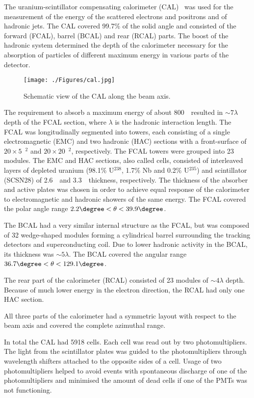 The uranium-scintillator compensating calorimeter (CAL)~\cite{thesis:kruger:1992,nim:a309:77,nim:a309:101,nim:a321:356,nim:a336:23} was used for the measurement of the energy of the scattered electrons and positrons and of hadronic jets. The CAL covered 99.7\% of the solid angle and consisted of the forward (FCAL), barrel (BCAL) and rear (RCAL) parts. The boost of the hadronic system determined the depth of the calorimeter necessary for the absorption of particles of different maximum energy in various parts of the detector.
\begin{figure}[h]
	\centering
		\texttt{[image: ./Figures/cal.jpg]}
	\caption{Schematic view of the CAL along the beam axis.}
	\label{fig:cal}
\end{figure}

The requirement to absorb a maximum energy of about 800~\GeV\, resulted in $\sim 7 \lambda$ depth of the FCAL section, where $\lambda$ is the hadronic interaction length. The FCAL was longitudinally segmented into towers, each consisting of a single electromagnetic (EMC) and two hadronic (HAC) sections with a front-surface of $20 \times 5$~\cm$^{2}$ and $20 \times 20$~\cm$^{2}$, respectively. The FCAL towers were grouped into 23 modules. The EMC and HAC sections, also called cells, consisted of interleaved layers of depleted uranium (98.1\% U$^{238}$, 1.7\% Nb and 0.2\% U$^{235}$) and scintillator (SCSN28) of 2.6~\mm\, and 3.3~\mm\, thickness, respectively. The thickness of the absorber and active plates was chosen in order to achieve equal response of the calorimeter to electromagnetic and hadronic showers of the same energy. The FCAL covered the polar angle range $2.2\degree < \theta < 39.9\degree$.

The BCAL had a very similar internal structure as the FCAL, but was composed of 32 wedge-shaped modules forming a cylindrical barrel surrounding the tracking detectors and superconducting coil. Due to lower hadronic activity in the BCAL, its thickness was $\sim 5 \lambda$. The BCAL covered the angular range $36.7\degree< \theta <129.1\degree$.

The rear part of the calorimeter (RCAL) consisted of 23 modules of $\sim 4 \lambda$ depth. Because of much lower energy in the electron direction, the RCAL had only one HAC section.

All three parts of the calorimeter had a symmetric layout with respect to the beam axis and covered the complete azimuthal range.

In total the CAL had 5918 cells. Each cell was read out by two photomultipliers. The light from the scintillator plates was guided to the photomultipliers through wavelength shifters attached to the opposite sides of a cell. Usage of two photomultipliers helped to avoid events with spontaneous discharge of one of the photomultipliers and minimised the amount of dead cells if one of the PMTs was not functioning.

